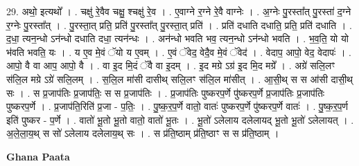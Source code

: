 \documentclass[17pt]{extarticle}
\begin{document}
29. अथो॒ इत्यथो᳚ । . चक्षु॑ रे॒वैव चक्षु॒ श्चक्षु॑ रे॒व । . ए॒वाग्ने र॒ग्ने रे॒वै वाग्नेः । . अ॒ग्नेः पु॒रस्ता᳚त् पु॒रस्ता॑ द॒ग्ने र॒ग्नेः पु॒रस्ता᳚त् । . पु॒रस्ता॒त् प्रति॒ प्रति॑ पु॒रस्ता᳚त् पु॒रस्ता॒त् प्रति॑ । . प्रति॑ दधाति दधाति॒ प्रति॒ प्रति॑ दधाति । . द॒धा॒ त्यन॒न्धो ऽन॑न्धो दधाति दधा॒ त्यन॑न्धः । . अन॑न्धो भवति भव॒ त्यन॒न्धो ऽन॑न्धो भवति । . भ॒व॒ति॒ यो यो भ॑वति भवति॒ यः । . य ए॒व मे॒वं ॅयो य ए॒वम् । . ए॒वं ॅवेद॒ वेदै॒व मे॒वं ॅवेद॑ । . वेदाप॒ आपो॒ वेद॒ वेदापः॑ । . आपो॒ वै वा आप॒ आपो॒ वै । . वा इ॒द मि॒दं ॅवै वा इ॒दम् । . इ॒द मग्रे ऽग्र॑ इ॒द मि॒द मग्रे᳚ । . अग्रे॑ सलि॒लꣳ स॑लि॒ल मग्रे ऽग्रे॑ सलि॒लम् । . स॒लि॒ल मा॑सी दासीथ् सलि॒लꣳ स॑लि॒ल मा॑सीत् । . आ॒सी॒थ् स स आ॑सी दासी॒थ् सः । . स प्र॒जाप॑तिः प्र॒जाप॑तिः॒ स स प्र॒जाप॑तिः । . प्र॒जाप॑तिः पुष्करप॒र्णे पु॑ष्करप॒र्णे प्र॒जाप॑तिः प्र॒जाप॑तिः पुष्करप॒र्णे । . प्र॒जाप॑ति॒रिति॑ प्र॒जा - प॒तिः॒ । . पु॒ष्क॒र॒प॒र्णे वातो॒ वातः॑ पुष्करप॒र्णे पु॑ष्करप॒र्णे वातः॑ । . पु॒ष्क॒र॒प॒र्ण इति॑ पुष्कर - प॒र्णे । . वातो॑ भू॒तो भू॒तो वातो॒ वातो॑ भू॒तः । . भू॒तो॑ ऽलेलाय दलेलायद् भू॒तो भू॒तो॑ ऽलेलायत् । . अ॒ले॒ला॒य॒थ् स सो॑ ऽलेलाय दलेलाय॒थ् सः । . स प्र॑ति॒ष्ठाम् प्र॑ति॒ष्ठाꣳ स स प्र॑ति॒ष्ठाम् । \newline

\textbf{Ghana Paata } \newline
\end{document}
